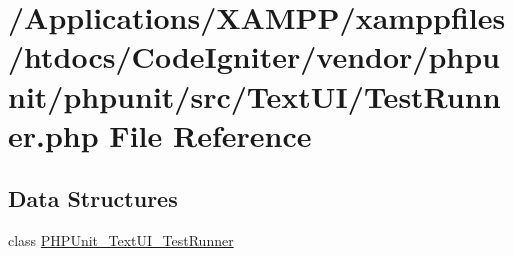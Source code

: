 \hypertarget{_test_runner_8php}{}\section{/\+Applications/\+X\+A\+M\+P\+P/xamppfiles/htdocs/\+Code\+Igniter/vendor/phpunit/phpunit/src/\+Text\+U\+I/\+Test\+Runner.php File Reference}
\label{_test_runner_8php}
\subsection*{Data Structures}
\begin{DoxyCompactItemize}
\item 
class \mbox{\hyperlink{class_p_h_p_unit___text_u_i___test_runner}{P\+H\+P\+Unit\+\_\+\+Text\+U\+I\+\_\+\+Test\+Runner}}
\end{DoxyCompactItemize}
